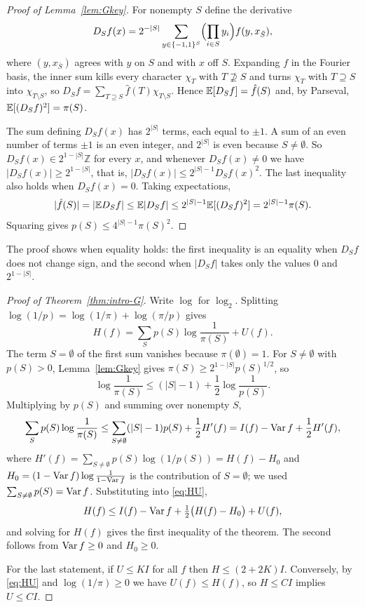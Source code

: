 \begin{proof}[Proof of Lemma~\ref{lem:Gkey}]\label{proof:lem:Gkey}
For nonempty $S$ define the derivative
\[
D_Sf(x)=2^{-|S|}\sum_{y\in\{-1,1\}^S}\Bigl(\prod_{i\in S}y_i\Bigr)f(y,x_{\bar S}),
\]
where $(y,x_{\bar S})$ agrees with $y$ on $S$ and with $x$ off $S$. Expanding $f$ in the Fourier basis, the inner sum kills every character $\chi_T$ with $T\not\supseteq S$ and turns $\chi_T$ with $T\supseteq S$ into $\chi_{T\setminus S}$, so $D_Sf=\sum_{T\supseteq S}\hat f(T)\chi_{T\setminus S}$. Hence $\mathbb{E}[D_Sf]=\hat f(S)$ and, by Parseval, $\mathbb{E}[(D_Sf)^2]=\pi(S)$.

The sum defining $D_Sf(x)$ has $2^{|S|}$ terms, each equal to $\pm1$. A sum of an even number of terms $\pm1$ is an even integer, and $2^{|S|}$ is even because $S\ne\emptyset$. So $D_Sf(x)\in2^{1-|S|}\mathbb Z$ for every $x$, and whenever $D_Sf(x)\ne0$ we have $|D_Sf(x)|\ge2^{1-|S|}$, that is, $|D_Sf(x)|\le2^{|S|-1}D_Sf(x)^2$. The last inequality also holds when $D_Sf(x)=0$. Taking expectations,
\[
|\hat f(S)|=|\mathbb{E} D_Sf|\le\mathbb{E}|D_Sf|\le2^{|S|-1}\mathbb{E}[(D_Sf)^2]=2^{|S|-1}\pi(S).
\]
Squaring gives $p(S)\le4^{|S|-1}\pi(S)^2$.
\end{proof}

The proof shows when equality holds: the first inequality is an equality when $D_Sf$ does not change sign, and the second when $|D_Sf|$ takes only the values $0$ and $2^{1-|S|}$.

\begin{proof}[Proof of Theorem~\ref{thm:intro-G}]\label{proof:thm:intro-G}
Write $\log$ for $\log_2$. Splitting $\log(1/p)=\log(1/\pi)+\log(\pi/p)$ gives
\begin{equation}\label{eq:HU}
H(f)=\sum_Sp(S)\log\frac1{\pi(S)}+U(f).
\end{equation}
The term $S=\emptyset$ of the first sum vanishes because $\pi(\emptyset)=1$. For $S\ne\emptyset$ with $p(S)>0$, Lemma~\ref{lem:Gkey} gives $\pi(S)\ge2^{1-|S|}p(S)^{1/2}$, so
\[
\log\frac1{\pi(S)}\le(|S|-1)+\frac12\log\frac1{p(S)}.
\]
Multiplying by $p(S)$ and summing over nonempty $S$,
\[
\sum_Sp(S)\log\frac1{\pi(S)}\le\sum_{S\ne\emptyset}(|S|-1)p(S)+\frac12H'(f)=I(f)-\operatorname{Var} f+\frac12H'(f),
\]
where $H'(f)=\sum_{S\ne\emptyset}p(S)\log(1/p(S))=H(f)-H_0$ and $H_0=(1-\operatorname{Var} f)\log\frac1{1-\operatorname{Var} f}$ is the contribution of $S=\emptyset$; we used $\sum_{S\ne\emptyset}p(S)=\operatorname{Var} f$. Substituting into \eqref{eq:HU},
\[
H(f)\le I(f)-\operatorname{Var} f+\tfrac12\bigl(H(f)-H_0\bigr)+U(f),
\]
and solving for $H(f)$ gives the first inequality of the theorem. The second follows from $\operatorname{Var} f\ge0$ and $H_0\ge0$.

For the last statement, if $U\le KI$ for all $f$ then $H\le(2+2K)I$. Conversely, by \eqref{eq:HU} and $\log(1/\pi)\ge0$ we have $U(f)\le H(f)$, so $H\le CI$ implies $U\le CI$.
\end{proof}

